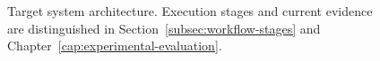 \begin{figure}[htbp]
\centering

\caption{Target system architecture. Execution stages and current evidence are distinguished in Section~\ref{subsec:workflow-stages} and Chapter~\ref{cap:experimental-evaluation}.}
\label{fig:pipeline}
\end{figure}
